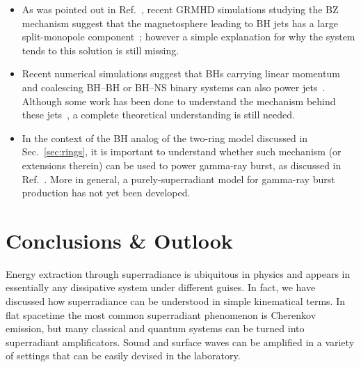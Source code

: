 \documentclass[11pt]{article}
\numberwithin{equation}{section} %
\begin{document}
\begin{itemize}
\item  As was pointed out in Ref.~\cite{Penna2014}, recent GRMHD simulations studying the BZ mechanism suggest that the 
magnetosphere leading to BH jets has a large split-monopole 
component~\cite{Tchekhovskoy:2012up,McKinney:2012vh,Penna:2013rga}; however a simple explanation for why the system 
tends to this solution is still missing. 

\item Recent numerical simulations suggest that BHs carrying linear momentum~\cite{Neilsen:2010ax} and coalescing BH--BH 
or BH--NS binary systems can also power jets~\cite{Palenzuela:2010nf}. Although some work has been done to understand 
the mechanism behind these jets~\cite{Lyutikov:2011vca,McWilliams:2011zi}, a complete theoretical understanding is still 
needed.

\item In the context of the BH analog of the two-ring model discussed in Sec.~\ref{sec:rings}, it is important to 
understand whether such mechanism (or extensions therein) can be used to power gamma-ray burst, as discussed in 
Ref.~\cite{PressRing}. More in general, a purely-superradiant model for gamma-ray burst production has not yet been 
developed.

\end{itemize}


\clearpage
\newpage
\section{Conclusions \& Outlook} \label{sec:Conclusion}
Energy extraction through superradiance is ubiquitous in physics and appears in essentially any dissipative system under different guises. In fact, we have discussed how superradiance can be understood in simple kinematical terms. In flat spacetime the most common superradiant phenomenon is Cherenkov emission, but many classical and quantum systems can be turned into superradiant amplificators. Sound and surface waves can be amplified in a variety of settings that can be easily devised in the laboratory.
\end{document}
